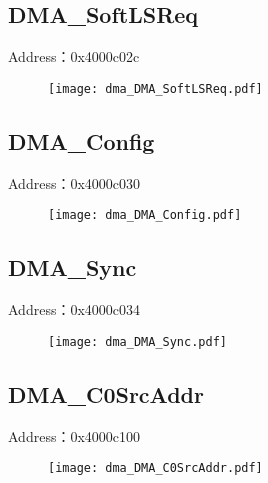 \subsection{DMA\_SoftLSReq}
\label{dma-DMA-SoftLSReq}
Address：0x4000c02c
 \begin{figure}[H]
\texttt{[image: dma\_DMA\_SoftLSReq.pdf]}
\end{figure}

\subsection{DMA\_Config}
\label{dma-DMA-Config}
Address：0x4000c030
 \begin{figure}[H]
\texttt{[image: dma\_DMA\_Config.pdf]}
\end{figure}

\subsection{DMA\_Sync}
\label{dma-DMA-Sync}
Address：0x4000c034
 \begin{figure}[H]
\texttt{[image: dma\_DMA\_Sync.pdf]}
\end{figure}

\subsection{DMA\_C0SrcAddr}
\label{dma-DMA-C0SrcAddr}
Address：0x4000c100
 \begin{figure}[H]
\texttt{[image: dma\_DMA\_C0SrcAddr.pdf]}
\end{figure}


